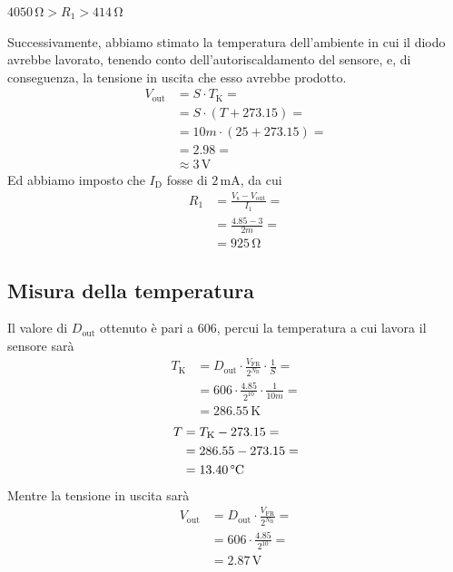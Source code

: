 \documentclass[a4paper]{article}
\begin{document}
			\begin{center}
				$ 4050 \, \mathrm{\Omega} > R_{1} > 414 \, \mathrm{\Omega} $
			\end{center}
			Successivamente, abbiamo stimato la temperatura dell'ambiente in cui il diodo avrebbe lavorato, tenendo conto dell'autoriscaldamento del sensore, e, di conseguenza, la tensione in uscita che esso avrebbe prodotto.
			\begin{equation*}
				\begin{split}
					V_{\mathrm{out}} &= S \cdot T_{\mathrm{K}} = \\
									 &= S \cdot (T + 273.15) = \\
									 &= 10m \cdot (25 + 273.15) = \\
									 &= 2.98 = \\
									 &\approx 3 \, \mathrm{V}
				\end{split}
			\end{equation*}
			Ed abbiamo imposto che $ I_{\mathrm{D}} $ fosse di $ 2 \, \mathrm{mA} $, da cui
			\begin{equation*}
				\begin{split}
					R_{1} &= \frac{V_{\mathrm{s}} - V_{\mathrm{out}}}{I_{1}} = \\
						  &= \frac{4.85 - 3}{2m} = \\
						  &= 925 \, \mathrm{\Omega}
				\end{split}
			\end{equation*}
		\subsection{Misura della temperatura} 
			Il valore di $ D_{\mathrm{out}} $ ottenuto è pari a $ 606 $, percui la temperatura a cui lavora il sensore sarà
			\begin{equation*}
				\begin{split}
					T_{\mathrm{K}} &= D_{\mathrm{out}} \cdot \frac{V_{\mathrm{FR}}}{2^{N_{\mathrm{B}}}} \cdot \frac{1}{S} = \\
								   &= 606 \cdot \frac{4.85}{2^{10}} \cdot \frac{1}{10m} = \\
								   &= 286.55 \, \mathrm{K}
				\end{split}
			\end{equation*}
			\begin{equation*}
				\begin{split}
					T &= T_{\mathrm{K}} - 273.15 = \\
					  &= 286.55 - 273.15 = \\
					  &= 13.40 \, \mathrm{\text{\textdegree} C}
				\end{split}
			\end{equation*}
			Mentre la tensione in uscita sarà
			\begin{equation*}
				\begin{split}
					V_{\mathrm{out}} &= D_{\mathrm{out}} \cdot \frac{V_{\mathrm{FR}}}{2^{N_{\mathrm{B}}}} = \\
									 &= 606 \cdot \frac{4.85}{2^{10}} = \\
									 &= 2.87 \, \mathrm{V}
				\end{split}
			\end{equation*}
\end{document}
